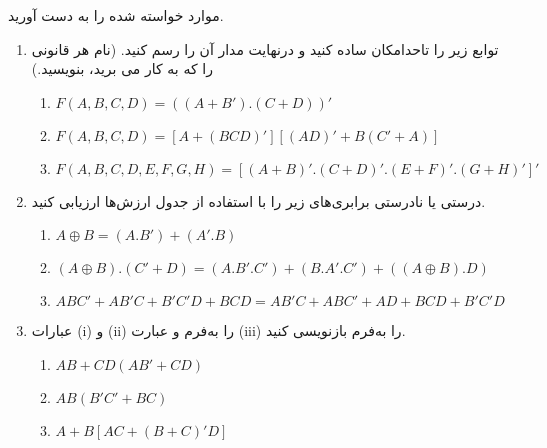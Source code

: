 موارد خواسته شده را به دست آورید.

\begin{enumerate}
	\item 
	توابع زیر را تاحدامکان ساده کنید و درنهایت مدار آن را رسم کنید. (نام هر قانونی را که به کار می برید، بنویسید.)
	
	\begin{latin}
		\begin{enumerate}
			\item $F(A, B, C, D) = ((A + B').(C + D))'$
			
			\item $F(A,B,C,D) = [A + (BCD)' ][ (AD)' + B(C' + A) ]$
			
			\item $F(A,B,C,D,E,F,G,H) = [ (A + B)' . (C + D)' . (E + F)' . (G + H)' ]'$
		\end{enumerate}
	\end{latin}
	
	
	\item	
	درستی یا نادرستی برابری‌های زیر را با استفاده از جدول ارزش‌ها ارزیابی کنید.
	\begin{latin}
		\begin{enumerate}
			
			\item $A \oplus B = (A.B') + (A'.B)$
			
			\item $(A \oplus B) . (C' + D) = (A . B' . C') + (B . A' . C') + ((A \oplus B) . D)$
			
			\item $ABC′ + AB'C + B'C'D + BCD = AB'C + ABC' + AD + BCD + B'C'D$
		\end{enumerate}
	\end{latin}
	
	
	\item 
	عبارات (i) و (ii) را به‌فرم  و عبارت (iii) را به‌فرم  بازنویسی کنید.
	\begin{latin}
		\begin{enumerate}
			\item $AB + CD (AB' + CD)$
			
			\item $AB (B' C' + BC)$
			
			\item $A + B[AC + (B + C)' D]$
		\end{enumerate}
	\end{latin}
	
	
	
	
\end{enumerate}